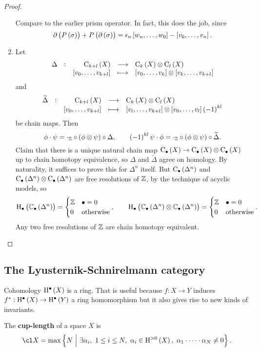 \begin{proof}
\begin{enumerate}[leftmargin=0.5in, label=Sketch \arabic*.]
Compare to the earlier prism operator. In fact, this does the job, since
$$ \da\br{P\br{\sigma}} + P\br{\da\br{\sigma}} = \epsilon_n\sbr{w_n, \dots, w_0} - \sbr{v_0, \dots, v_n}. $$
\item Let
$$ \function[\Delta]{\C_{k + l}\br{X}}{\C_k\br{X} \otimes \C_l\br{X}}{\sbr{v_0, \dots, v_{k + l}}}{\sbr{v_0, \dots, v_k} \otimes \sbr{v_k, \dots, v_{k + l}}} $$
and
$$ \function[\widetilde{\Delta}]{\C_{k + l}\br{X}}{\C_k\br{X} \otimes \C_l\br{X}}{\sbr{v_0, \dots, v_{k + l}}}{\sbr{v_l, \dots, v_{k + l}} \otimes \sbr{v_0, \dots, v_l}\br{-1}^{kl}} $$
be chain maps. Then
$$ \phi \cdot \psi = \cdot_\ZZ \circ \br{\phi \otimes \psi} \circ \Delta, \qquad \br{-1}^{kl}\psi \cdot \phi = \cdot_\ZZ \circ \br{\phi \otimes \psi} \circ \widetilde{\Delta}. $$
Claim that there is a unique natural chain map $ \C_\bullet\br{X} \to \C_\bullet\br{X} \otimes \C_\bullet\br{X} $ up to chain homotopy equivalence, so $ \Delta $ and $ \widetilde{\Delta} $ agree on homology. By naturality, it suffices to prove this for $ \Delta^n $ itself. But $ \C_\bullet\br{\Delta^n} $ and $ \C_\bullet\br{\Delta^n} \otimes \C_\bullet\br{\Delta^n} $ are free resolutions of $ \mathbb{Z} $, by the technique of acyclic models, so
$$ \H_\bullet\br{\CC_\bullet\br{\Delta^n}} =
\begin{cases}
\ZZ & \bullet = 0 \\
0 & \text{otherwise}
\end{cases},
\qquad \H_\bullet\br{\CC_\bullet\br{\Delta^n} \otimes \CC_\bullet\br{\Delta^n}} =
\begin{cases}
\ZZ & \bullet = 0 \\
0 & \text{otherwise}
\end{cases}.
$$
Any two free resolutions of $ \mathbb{Z} $ are chain homotopy equivalent.
\end{enumerate}
\end{proof}

\pagebreak

\subsection{The Lyusternik-Schnirelmann category}


Cohomology $ \H^\bullet\br{X} $ is a ring. That is useful because $ f : X \to Y $ induces $ f^* : \H^\bullet\br{X} \to \H^\bullet\br{Y} $ a ring homomorphism but it also gives rise to new kinds of invariants.

\begin{definition*}
The \textbf{cup-length} of a space $ X $ is
$$ \cl X = \max \cbr{N \st \exists \alpha_i, \ 1 \le i \le N, \ \alpha_i \in \H^{> 0}\br{X}, \ \alpha_1 \cdot \dots \cdot \alpha_N \ne 0}. $$
\end{definition*}

